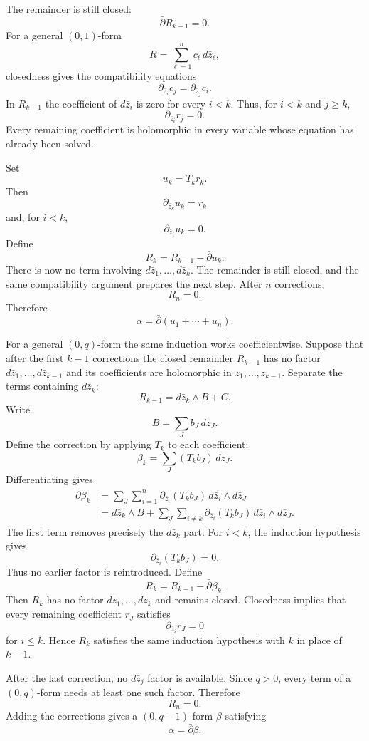 The remainder is still closed:
$$
\bar\partial R_{k-1}=0.
$$
For a general $(0,1)$-form
$$
R
=
\sum_{\ell=1}^n
c_\ell\,d\bar z_\ell,
$$
closedness gives the compatibility equations
$$
\partial_{\bar z_i}c_j
=
\partial_{\bar z_j}c_i.
$$
In $R_{k-1}$ the coefficient of
$d\bar z_i$ is zero for every $i<k$.
Thus, for $i<k$ and $j\geq k$,
$$
\partial_{\bar z_i}r_j=0.
$$
Every remaining coefficient is holomorphic
in every variable whose equation has already
been solved.

Set
$$
u_k=T_kr_k.
$$
Then
$$
\partial_{\bar z_k}u_k=r_k
$$
and, for $i<k$,
$$
\partial_{\bar z_i}u_k=0.
$$
Define
$$
R_k
=
R_{k-1}
-
\bar\partial u_k.
$$
There is now no term involving
$d\bar z_1,\ldots,d\bar z_k$. The remainder
is still closed, and the same compatibility
argument prepares the next step. After $n$
corrections,
$$
R_n=0.
$$
Therefore
$$
\alpha
=
\bar\partial
(u_1+\cdots+u_n).
$$

For a general $(0,q)$-form the same
induction works coefficientwise. Suppose
that after the first $k-1$ corrections the
closed remainder $R_{k-1}$ has no factor
$d\bar z_1,\ldots,d\bar z_{k-1}$ and its
coefficients are holomorphic in
$z_1,\ldots,z_{k-1}$. Separate the terms
containing $d\bar z_k$:
$$
R_{k-1}
=
d\bar z_k\wedge B+C.
$$
Write
$$
B
=
\sum_J b_J\,d\bar z_J.
$$
Define the correction by applying $T_k$ to
each coefficient:
$$
\beta_k
=
\sum_J
(T_kb_J)\,d\bar z_J.
$$
Differentiating gives
$$
\begin{aligned}
\bar\partial\beta_k
&=
\sum_J\sum_{i=1}^n
\partial_{\bar z_i}(T_kb_J)
\,d\bar z_i\wedge d\bar z_J\\
&=
d\bar z_k\wedge B
+
\sum_J\sum_{i\neq k}
\partial_{\bar z_i}(T_kb_J)
\,d\bar z_i\wedge d\bar z_J.
\end{aligned}
$$
The first term removes precisely the
$d\bar z_k$ part. For $i<k$, the induction
hypothesis gives
$$
\partial_{\bar z_i}(T_kb_J)=0.
$$
Thus no earlier factor is reintroduced.
Define
$$
R_k
=
R_{k-1}
-
\bar\partial\beta_k.
$$
Then $R_k$ has no factor
$d\bar z_1,\ldots,d\bar z_k$ and remains
closed. Closedness implies that every
remaining coefficient $r_J$ satisfies
$$
\partial_{\bar z_i}r_J=0
$$
for $i\leq k$. Hence $R_k$ satisfies the
same induction hypothesis with $k$ in place
of $k-1$.

After the last correction, no
$d\bar z_j$ factor is available. Since
$q>0$, every term of a $(0,q)$-form needs at
least one such factor. Therefore
$$
R_n=0.
$$
Adding the corrections gives a
$(0,q-1)$-form $\beta$ satisfying
$$
\alpha=\bar\partial\beta.
$$


